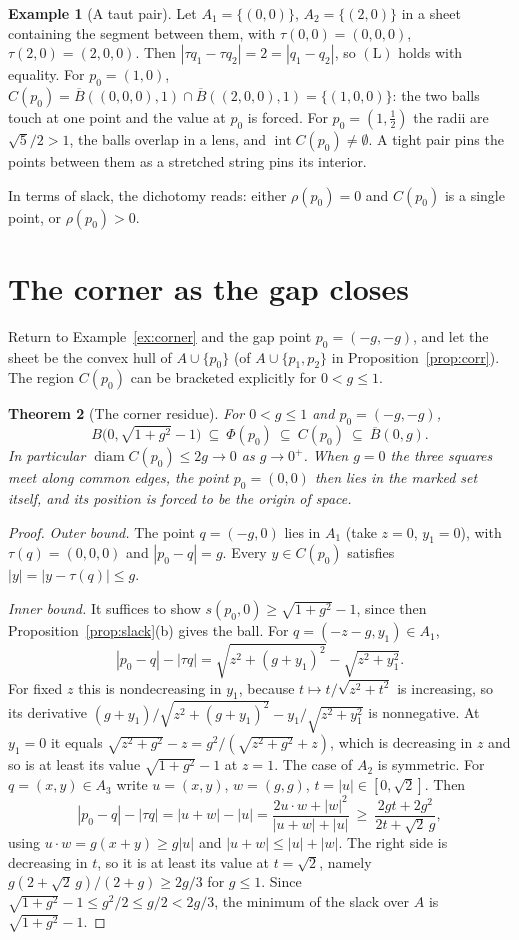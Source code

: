 \documentclass[11pt]{article}
\newtheorem{theorem}{Theorem}
\theoremstyle{definition}
\newtheorem{example}[theorem]{Example}
\theoremstyle{remark}
\begin{document}
\begin{example}[A taut pair]\label{ex:taut}
Let $A_1=\{(0,0)\}$, $A_2=\{(2,0)\}$ in a sheet containing the segment between them, with $\tau(0,0)=(0,0,0)$, $\tau(2,0)=(2,0,0)$. Then $|\tau q_1-\tau q_2|=2=|q_1-q_2|$, so $(\mathrm L)$ holds with equality. For $p_0=(1,0)$, $C(p_0)=\overline B((0,0,0),1)\cap\overline B((2,0,0),1)=\{(1,0,0)\}$: the two balls touch at one point and the value at $p_0$ is forced. For $p_0=(1,\tfrac12)$ the radii are $\sqrt5/2>1$, the balls overlap in a lens, and $\operatorname{int}C(p_0)\ne\emptyset$. A tight pair pins the points between them as a stretched string pins its interior.
\end{example}

In terms of slack, the dichotomy reads: either $\rho(p_0)=0$ and $C(p_0)$ is a single point, or $\rho(p_0)>0$.

\section{The corner as the gap closes}

Return to Example~\ref{ex:corner} and the gap point $p_0=(-g,-g)$, and let the sheet be the convex hull of $A\cup\{p_0\}$ (of $A\cup\{p_1,p_2\}$ in Proposition~\ref{prop:corr}). The region $C(p_0)$ can be bracketed explicitly for $0<g\le1$.

\begin{theorem}[The corner residue]\label{thm:corner}
For $0<g\le1$ and $p_0=(-g,-g)$,
\[
B\bigl(0,\sqrt{1+g^2}-1\bigr)\ \subseteq\ \Phi(p_0)\ \subseteq\ C(p_0)\ \subseteq\ \overline B(0,g).
\]
In particular $\operatorname{diam}C(p_0)\le2g\to0$ as $g\to0^+$. When $g=0$ the three squares meet along common edges, the point $p_0=(0,0)$ then lies in the marked set itself, and its position is forced to be the origin of space.
\end{theorem}

\begin{proof}
\emph{Outer bound.} The point $q=(-g,0)$ lies in $A_1$ (take $z=0$, $y_1=0$), with $\tau(q)=(0,0,0)$ and $|p_0-q|=g$. Every $y\in C(p_0)$ satisfies $|y|=|y-\tau(q)|\le g$.

\emph{Inner bound.} It suffices to show $s(p_0,0)\ge\sqrt{1+g^2}-1$, since then Proposition~\ref{prop:slack}(b) gives the ball. For $q=(-z-g,y_1)\in A_1$,
\[
|p_0-q|-|\tau q|=\sqrt{z^2+(g+y_1)^2}-\sqrt{z^2+y_1^2}.
\]
For fixed $z$ this is nondecreasing in $y_1$, because $t\mapsto t/\sqrt{z^2+t^2}$ is increasing, so its derivative $(g+y_1)/\sqrt{z^2+(g+y_1)^2}-y_1/\sqrt{z^2+y_1^2}$ is nonnegative. At $y_1=0$ it equals $\sqrt{z^2+g^2}-z=g^2/(\sqrt{z^2+g^2}+z)$, which is decreasing in $z$ and so is at least its value $\sqrt{1+g^2}-1$ at $z=1$. The case of $A_2$ is symmetric. For $q=(x,y)\in A_3$ write $u=(x,y)$, $w=(g,g)$, $t=|u|\in[0,\sqrt2]$. Then
\[
|p_0-q|-|\tau q|=|u+w|-|u|=\frac{2u\cdot w+|w|^2}{|u+w|+|u|}\ \ge\ \frac{2gt+2g^2}{2t+\sqrt2\,g},
\]
using $u\cdot w=g(x+y)\ge g|u|$ and $|u+w|\le|u|+|w|$. The right side is decreasing in $t$, so it is at least its value at $t=\sqrt2$, namely $g(2+\sqrt2\,g)/(2+g)\ge2g/3$ for $g\le1$. Since $\sqrt{1+g^2}-1\le g^2/2\le g/2<2g/3$, the minimum of the slack over $A$ is $\sqrt{1+g^2}-1$.
\end{proof}
\end{document}
